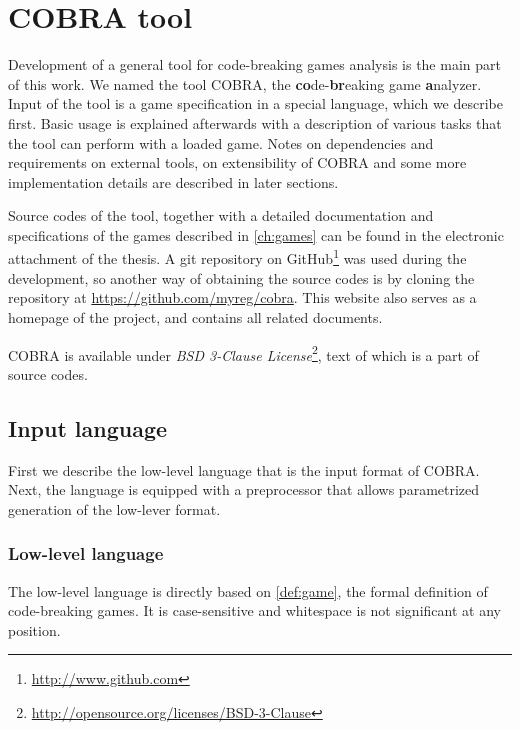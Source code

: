 \chapter{COBRA tool}
\label{ch:cobra}
Development of a general tool for
  code-breaking games analysis is the main part of this work.
We named the tool COBRA, the \textbf{co}de-\textbf{br}eaking game \textbf{a}nalyzer.
Input of the tool is a game specification in a special language, which
  we describe first.
Basic usage is explained afterwards with
  a description of various tasks that the tool can perform with a loaded game.
Notes on dependencies and requirements on external tools,
  on extensibility of COBRA and
  some more implementation details
  are described in later sections.

Source codes of the tool, together with a detailed documentation
  and specifications of the games described in \autoref{ch:games}
  can be found in the electronic attachment of the thesis.
A git repository on GitHub\footnote{\url{http://www.github.com}}
  was used during the development,
  so another way of obtaining the source codes is by cloning
  the repository at \url{https://github.com/myreg/cobra}.
This website also serves as a homepage of the project, and contains
  all related documents.

COBRA is available under \emph{BSD 3-Clause License}\footnote{\url{http://opensource.org/licenses/BSD-3-Clause}},
  text of which is a part of source codes.

\section{Input language}

First we describe the low-level language that is the input format of COBRA.
Next, the language is equipped with a preprocessor that allows
  parametrized generation of the low-lever format.

\subsection{Low-level language}

The low-level language is directly based on \autoref{def:game}, the formal definition of
  code-breaking games.
It is case-sensitive and whitespace is not significant at any position.

\newcommand{\symb}[1]{\textcolor{DarkBlue}{$<$#1$>$}}
\newcommand{\txt}[1]{\;\textsc{#1}\;}
\newcommand{\term}[1]{\;\textrm{#1}\;}

